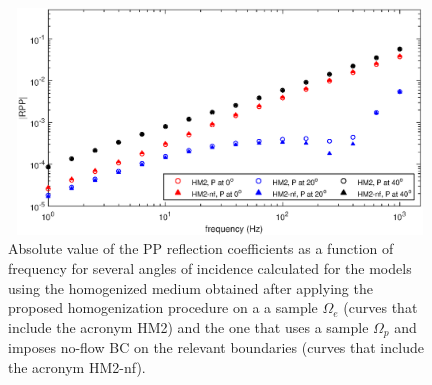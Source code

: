 \documentclass[draft]{agujournal2019}
\begin{document}
\begin{figure}[!ht]
\centering
        \includegraphics[width= 120mm, height=60mm]{rpp_2sandfracw.eps}
\caption{ Absolute value of the PP reflection coefficients as a function of frequency for several angles of incidence calculated for the models using the homogenized medium obtained after applying the proposed homogenization procedure on a a sample $\Omega_e $ (curves that include the acronym HM2) and the one that uses a sample $\Omega_p$ and imposes no-flow BC on the relevant boundaries (curves that include the acronym HM2-nf).}
\label{fig.10}
\end{figure}
\end{document}
